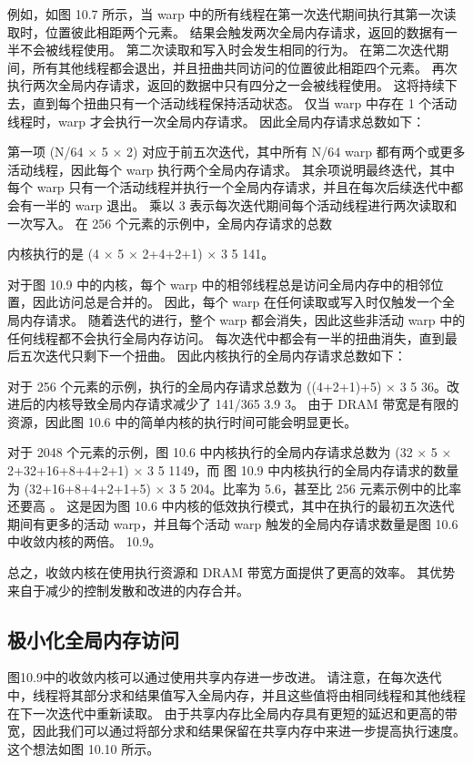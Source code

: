 例如，如图 10.7 所示，当 warp 中的所有线程在第一次迭代期间执行其第一次读取时，位置彼此相距两个元素。 结果会触发两次全局内存请求，返回的数据有一半不会被线程使用。 第二次读取和写入时会发生相同的行为。 在第二次迭代期间，所有其他线程都会退出，并且扭曲共同访问的位置彼此相距四个元素。 再次执行两次全局内存请求，返回的数据中只有四分之一会被线程使用。 这将持续下去，直到每个扭曲只有一个活动线程保持活动状态。 仅当 warp 中存在 1 个活动线程时，warp 才会执行一次全局内存请求。 因此全局内存请求总数如下：

第一项 (N/64 × 5 × 2) 对应于前五次迭代，其中所有 N/64 warp 都有两个或更多活动线程，因此每个 warp 执行两个全局内存请求。 其余项说明最终迭代，其中每个 warp 只有一个活动线程并执行一个全局内存请求，并且在每次后续迭代中都会有一半的 warp 退出。 乘以 3 表示每次迭代期间每个活动线程进行两次读取和一次写入。 在 256 个元素的示例中，全局内存请求的总数

内核执行的是 (4 × 5 × 2+4+2+1) × 3 5 141。

对于图 10.9 中的内核，每个 warp 中的相邻线程总是访问全局内存中的相邻位置，因此访问总是合并的。 因此，每个 warp 在任何读取或写入时仅触发一个全局内存请求。 随着迭代的进行，整个 warp 都会消失，因此这些非活动 warp 中的任何线程都不会执行全局内存访问。 每次迭代中都会有一半的扭曲消失，直到最后五次迭代只剩下一个扭曲。 因此内核执行的全局内存请求总数如下：

对于 256 个元素的示例，执行的全局内存请求总数为 ((4+2+1)+5) × 3 5 36。改进后的内核导致全局内存请求减少了 141/365 3.9 3。 由于 DRAM 带宽是有限的资源，因此图 10.6 中的简单内核的执行时间可能会明显更长。

对于 2048 个元素的示例，图 10.6 中内核执行的全局内存请求总数为 (32 × 5 × 2+32+16+8+4+2+1) × 3 5 1149，而 图 10.9 中内核执行的全局内存请求的数量为 (32+16+8+4+2+1+5) × 3 5 204。比率为 5.6，甚至比 256 元素示例中的比率还要高 。 这是因为图 10.6 中内核的低效执行模式，其中在执行的最初五次迭代期间有更多的活动 warp，并且每个活动 warp 触发的全局内存请求数量是图 10.6 中收敛内核的两倍。 10.9。

总之，收敛内核在使用执行资源和 DRAM 带宽方面提供了更高的效率。 其优势来自于减少的控制发散和改进的内存合并。

\subsection{极小化全局内存访问}
图10.9中的收敛内核可以通过使用共享内存进一步改进。 请注意，在每次迭代中，线程将其部分求和结果值写入全局内存，并且这些值将由相同线程和其他线程在下一次迭代中重新读取。 由于共享内存比全局内存具有更短的延迟和更高的带宽，因此我们可以通过将部分求和结果保留在共享内存中来进一步提高执行速度。 这个想法如图 10.10 所示。

